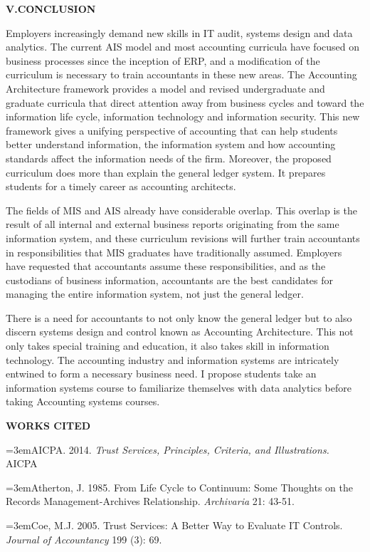 \documentclass[12pt]{article}
\newcommand{\Section}[2]{\vspace{.2in}\centerline{\normalsize{}\textbf{#1\quad{}\MakeUppercase{#2}}}\nopagebreak{}\smallskip{}\indent{}}
\newcommand{\Reference}[1]{\parindent=0pt\hangindent=3em\hangafter=1#1\vspace{.15in}}
\begin{document}
\Section{V.}{Conclusion}
Employers increasingly demand new skills in IT audit, systems design and data analytics. The current AIS model and most accounting curricula have focused on business processes since the inception of ERP, and a modification of the curriculum is necessary to train accountants in these new areas. The Accounting Architecture framework provides a model and revised undergraduate and graduate curricula that direct attention away from business cycles and toward the information life cycle, information technology and information security. This new framework gives a unifying perspective of accounting that can help students better understand information, the information system and how accounting standards affect the information needs of the firm. Moreover, the proposed curriculum does more than explain the general ledger system. It prepares students for a timely career as accounting architects.

The fields of MIS and AIS already have considerable overlap. This overlap is the result of all internal and external business reports originating from the same information system, and these curriculum revisions will further train accountants in responsibilities that MIS graduates have traditionally assumed. Employers have requested that accountants assume these responsibilities, and as the custodians of business information, accountants are the best candidates for managing the entire information system, not just the general ledger.

There is a need for accountants to not only know the general ledger but to also discern systems design and control known as Accounting Architecture. This not only takes special training and education, it also takes skill in information technology. The accounting industry and information systems are intricately entwined to form a necessary business need. I propose students take an information systems course to familiarize themselves with data analytics before taking Accounting systems courses.
\newpage{}

\centerline{\textbf{\MakeUppercase{Works Cited}}}
\smallskip{}
\singlespace{}
\Reference{AICPA. 2014. \emph{Trust Services, Principles, Criteria, and Illustrations.} AICPA}

\Reference{Atherton, J. 1985. From Life Cycle to Continuum: Some Thoughts on the Records Management-Archives Relationship. \emph{Archivaria} 21: 43-51.}

\Reference{Coe, M.J. 2005. Trust Services: A Better Way to Evaluate IT Controls. \emph{Journal of Accountancy} 199 (3): 69.}
\end{document}
